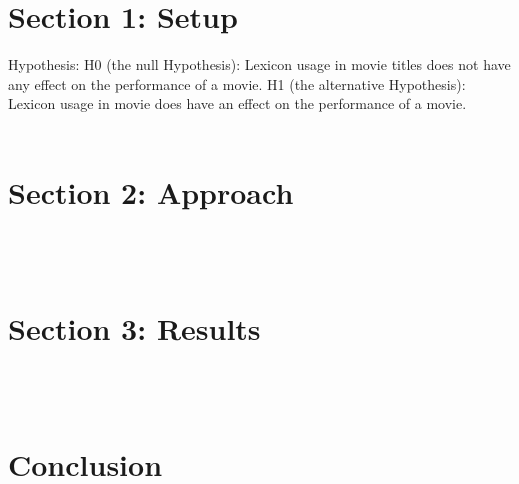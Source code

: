 \documentclass[font=10pt]{article}
\begin{document}
    \section{Section 1: Setup}
    Hypothesis:
    H0 (the null Hypothesis): Lexicon usage in movie titles does not have any effect on the performance of a movie.
    H1 (the alternative Hypothesis): Lexicon usage in movie does have an effect on the performance of a movie.
    \\\\
    \section{Section 2: Approach}
    \\\\
    \section{Section 3: Results}
    \\\\
    \section{Conclusion}
\end{document}
